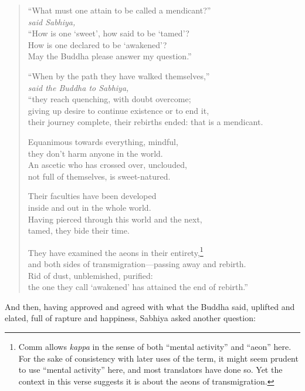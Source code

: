 \documentclass[12pt,openany]{book}%
\newcommand*{\scspeaker}[1]{\hspace{2em}\textit{#1}}
\begin{document}
\begin{verse}%
“What must one attain to be called a mendicant?” \\
\scspeaker{said Sabhiya, }\\
“How is one ‘sweet’, how said to be ‘tamed’? \\
How is one declared to be ‘awakened’? \\
May the Buddha please answer my question.” 

“When by the path they have walked themselves,” \\
\scspeaker{said the Buddha to Sabhiya, }\\
“they reach quenching, with doubt overcome; \\
giving up desire to continue existence or to end it, \\
their journey complete, their rebirths ended: that is a mendicant. 

Equanimous towards everything, mindful, \\
they don’t harm anyone in the world. \\
An ascetic who has crossed over, unclouded, \\
not full of themselves, is sweet-natured. 

Their faculties have been developed \\
inside and out in the whole world. \\
Having pierced through this world and the next, \\
tamed, they bide their time. 

They have examined the aeons in their entirety,\footnote{Comm allows \textit{kappa} in the sense of both “mental activity” and “aeon” here. For the sake of consistency with later uses of the term, it might seem prudent to use “mental activity” here, and most translators have done so. Yet the context in this verse suggests it is about the aeons of transmigration. } \\
and both sides of transmigration—passing away and rebirth. \\
Rid of dust, unblemished, purified: \\
the one they call ‘awakened’ has attained the end of rebirth.” 

%
\end{verse}

And then, having approved and agreed with what the Buddha said, uplifted and elated, full of rapture and happiness, Sabhiya asked another question: 
\end{document}
